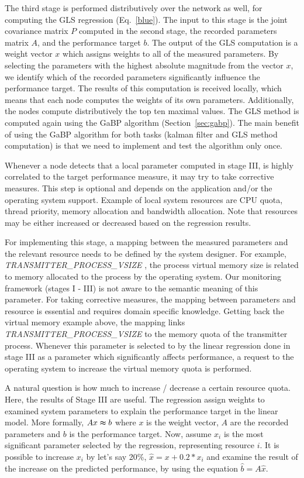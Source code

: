 \documentclass[times, 10pt,twocolumn]{article}
\begin{document}
The third stage is performed distributively over the network as well, for computing the GLS regression (Eq.~\ref{blue}). The input to this stage is the joint covariance matrix $P$ computed in the second stage, the
recorded parameters matrix $A$, and the performance target $b$. The output of the GLS computation is a weight
vector $x$ which assigns weights to all of the measured parameters. By selecting the parameters
with the highest absolute magnitude from the vector $x$, we identify which of the recorded parameters
significantly influence the performance target. The results of this computation is received locally, which means
that each node computes the weights of its own parameters. Additionally, the nodes compute distributively
the top ten maximal values. The GLS method is computed again using the GaBP algorithm (Section~\ref{sec:gabp}).
The main benefit of using the GaBP algorithm for both tasks (kalman filter and GLS method computation) is that we need to implement and test the algorithm only once.

\label{prediction}
Whenever a node detects that a local parameter computed in stage III, is highly correlated to the target
performance measure, it may try to take corrective measures. This step is optional and depends on the application and/or the operating system
support. Example of local system resources are CPU quota, thread priority, memory
allocation and bandwidth allocation. Note that resources may be either increased or decreased based on the regression results.

For implementing this stage, a mapping between the measured parameters and the relevant resource needs to be
defined by the system designer. For example, {\em TRANSMITTER\_PROCESS\_VSIZE }, the process virtual memory size is related
to memory allocated to the process by the operating system. Our monitoring framework (stages I - III) is not aware to the semantic meaning of this parameter. For taking corrective measures, the mapping between parameters
and resource is essential and requires domain specific knowledge. Getting back the virtual memory example above,
the mapping links {\em TRANSMITTER\_PROCESS\_VSIZE} to the memory quota of the transmitter process. Whenever 
this parameter is selected to by the linear regression done in stage III as a parameter which significantly
affects performance, a request to the operating system to increase the virtual memory quota is performed. 

A natural question is how much to increase / decrease a certain resource quota. Here, the results of Stage III are useful. The regression assign weights to examined system parameters to explain the performance target in the linear model. More formally, $Ax \thickapprox b$ where $x$ is the weight vector, $A$ are the recorded parameters and $b$ is the performance target. Now, assume $x_i$ is the most significant parameter selected by the regression, representing resource $i$. It is possible to increase $x_i$ by let's say 20\%, $\hat{x} = x + 0.2*x_i$ and examine the result of the increase on the predicted performance, by using the equation $\hat{b} = A\hat{x}$.
\end{document}
